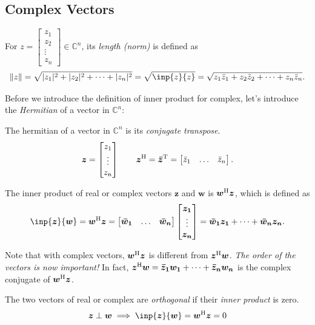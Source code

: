 \subsection{Complex Vectors}
\begin{definition}
For $z=\begin{bmatrix}
z_1\\z_2\\\vdots\\z_n
\end{bmatrix}\in\mathbb{C}^n$, its \emph{length (norm)}
 is defined as
\[
\|z\|=\sqrt{|z_1|^2+|z_2|^2+\dots+|z_n|^2}=\sqrt{\inp{z}{z}}=\sqrt{z_1\bar z_1+z_2\bar z_2+\dots+z_n\bar z_n}.
\]
\end{definition}
Before we introduce the definition of inner product for complex, let's introduce the \textit{Hermitian} of a vector in $\mathbb{C}^n$:
\begin{definition}[Hermitian]
The hermitian of a vector in $\mathbb{C}^n$ is its \textit{conjugate transpose}.
\[
\bm z=\begin{bmatrix}
z_1\\\vdots\\z_n
\end{bmatrix}\qquad
\bm z^{\mathrm H}=\bm{\bar z}^{\mathrm T}=\begin{bmatrix}
\bar z_1&\dots&\bar z_n
\end{bmatrix}.
\]
\end{definition}
\newpage
\begin{definition}
The inner product of real or complex vectors $\bm z$ and $\bm w$ is $\bm w^{\mathrm H}\bm z$, which is defined as
\[
\inp{\bm z}{\bm w}=\bm w\Her\bm z=\begin{bmatrix}
\bm{\bar w_1}&\dots&\bm{\bar w_n}
\end{bmatrix}\begin{bmatrix}
\bm{z_1}\\\vdots\\\bm{z_n}
\end{bmatrix}=\bm{\bar w_1}\bm{z_1}+\dots+\bm{\bar w_n}\bm{z_n}.
\]
\end{definition}
\begin{remark}
Note that with complex vectors, $\bm w^{\mathrm H}\bm z$ is different from $\bm z^{\mathrm H}\bm w$. \emph{The order of the vectors is now important!} In fact, $\bm z^{\mathrm H}\bm w=\bm{\bar z_1}\bm{w_1}+\dots+\bm{\bar z_n}\bm{w_n}$ is the complex conjugate of $\bm w^{\mathrm H}\bm z$.
\end{remark}
\begin{definition}[Orthogonal]
The two vectors of real or complex are \textit{orthogonal} if their \emph{inner product} is zero.
\[
\bm z\perp\bm w\implies
\inp{\bm z}{\bm w}=\bm w\Her\bm z=0
\]
\end{definition}
